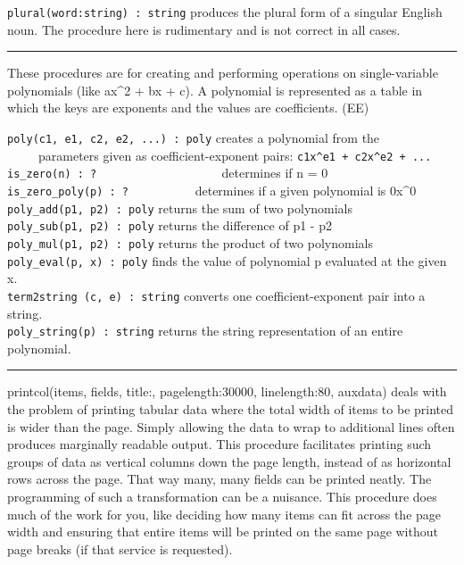 \texttt{plural(word:string) : string} produces the plural form of a singular English noun. The procedure here is
rudimentary and is not correct in all cases. 

\vspace{0.25cm}\hrule{}

These procedures are for creating and performing operations on
single-variable polynomials (like ax\^{}2 + bx + c).
A polynomial is represented as a table in which the keys are exponents
and the values are coefficients. (EE)

\texttt{poly(c1, e1, c2, e2, ...) : poly} creates a polynomial from
the\\
 \ \ \ \ \ parameters given as coefficient-exponent pairs:
\texttt{c1x\^{}e1 + c2x\^{}e2 + ...}\\
\texttt{is\_zero(n) : ?
\ }\ \ \ \ \ \ \ \ \ \ \ \ \ \ \ \ \ \ determines if n = 0\\
\texttt{is\_zero\_poly(p) : ?} \ \ \ \ \ \ \ \ \ \ determines if a given
polynomial is 0x\^{}0\\
\texttt{poly\_add(p1, p2) : poly} returns the sum of two
polynomials\\
\texttt{poly\_sub(p1, p2) : poly} returns the difference of p1 -
p2\\
\texttt{poly\_mul(p1, p2) : poly} returns the product of two
polynomials\\
\texttt{poly\_eval(p, x) : poly} finds the value of polynomial p
evaluated at the given x.\\
\texttt{term2string (c, e) : string} converts one coefficient-exponent
pair into a string.\\
\texttt{poly\_string(p) : string} returns the string representation of
an entire polynomial. 

\vspace{0.25cm}\hrule{}

printcol(items, fields, title:{\textquotedbl}{\textquotedbl},
pagelength:30000, linelength:80, auxdata) deals with the problem of
printing tabular data where the total width of items to be printed is
wider than the page. Simply allowing the data to wrap to additional
lines often produces marginally readable output. This procedure
facilitates printing such groups of data as vertical columns down the
page length, instead of as horizontal rows across the page. That way
many, many fields can be printed neatly. The programming of such a
transformation can be a nuisance. This procedure does much of the work
for you, like deciding how many items can fit across the page width and
ensuring that entire items will be printed on the same page without
page breaks (if that service is requested).

